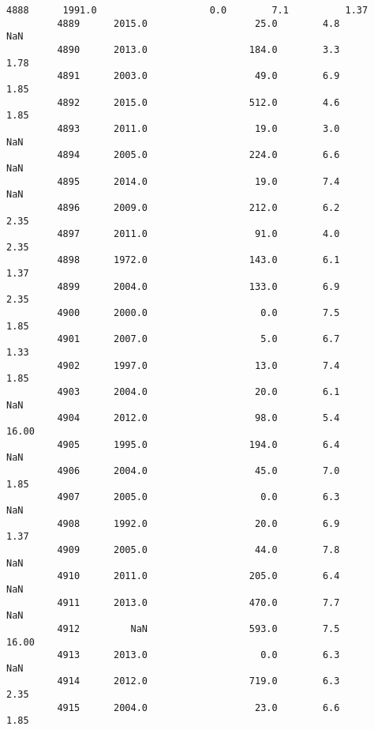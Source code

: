 \documentclass[11pt]{article}
\begin{document}
\begin{Verbatim}[commandchars=\\\{\}]
         4888      1991.0                    0.0        7.1          1.37   
         4889      2015.0                   25.0        4.8           NaN   
         4890      2013.0                  184.0        3.3          1.78   
         4891      2003.0                   49.0        6.9          1.85   
         4892      2015.0                  512.0        4.6          1.85   
         4893      2011.0                   19.0        3.0           NaN   
         4894      2005.0                  224.0        6.6           NaN   
         4895      2014.0                   19.0        7.4           NaN   
         4896      2009.0                  212.0        6.2          2.35   
         4897      2011.0                   91.0        4.0          2.35   
         4898      1972.0                  143.0        6.1          1.37   
         4899      2004.0                  133.0        6.9          2.35   
         4900      2000.0                    0.0        7.5          1.85   
         4901      2007.0                    5.0        6.7          1.33   
         4902      1997.0                   13.0        7.4          1.85   
         4903      2004.0                   20.0        6.1           NaN   
         4904      2012.0                   98.0        5.4         16.00   
         4905      1995.0                  194.0        6.4           NaN   
         4906      2004.0                   45.0        7.0          1.85   
         4907      2005.0                    0.0        6.3           NaN   
         4908      1992.0                   20.0        6.9          1.37   
         4909      2005.0                   44.0        7.8           NaN   
         4910      2011.0                  205.0        6.4           NaN   
         4911      2013.0                  470.0        7.7           NaN   
         4912         NaN                  593.0        7.5         16.00   
         4913      2013.0                    0.0        6.3           NaN   
         4914      2012.0                  719.0        6.3          2.35   
         4915      2004.0                   23.0        6.6          1.85   
         

\end{Verbatim}
\end{document}
